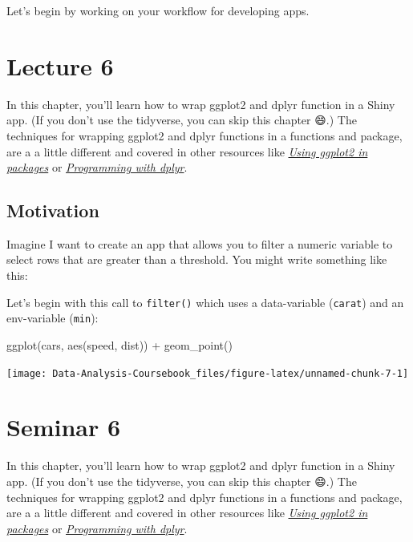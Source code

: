 \documentclass[
]{article}
\newenvironment{Shaded}{\begin{snugshade}}{\end{snugshade}}
\newcommand{\FunctionTok}[1]{\textcolor[rgb]{0.00,0.00,0.00}{#1}}
\newcommand{\NormalTok}[1]{#1}
\newcommand{\SpecialCharTok}[1]{\textcolor[rgb]{0.00,0.00,0.00}{#1}}
\begin{document}
Let's begin by working on your workflow for developing apps.

\hypertarget{lecture6}{%
\section{Lecture 6}\label{lecture6}}

In this chapter, you'll learn how to wrap ggplot2 and dplyr function in a Shiny app.
(If you don't use the tidyverse, you can skip this chapter 😄.) The techniques for wrapping ggplot2 and dplyr functions in a functions and package, are a a little different and covered in other resources like \href{http://ggplot2.tidyverse.org/dev/articles/ggplot2-in-packages.html}{\emph{Using ggplot2 in packages}} or \href{http://dplyr.tidyverse.org/articles/programming.html}{\emph{Programming with dplyr}}.

\hypertarget{tidy-motivation}{%
\subsection{Motivation}\label{tidy-motivation}}

Imagine I want to create an app that allows you to filter a numeric variable to select rows that are greater than a threshold.
You might write something like this:

Let's begin with this call to \texttt{filter()} which uses a data-variable (\texttt{carat}) and an env-variable (\texttt{min}):

\begin{Shaded}
\begin{Highlighting}[]
\FunctionTok{ggplot}\NormalTok{(cars, }\FunctionTok{aes}\NormalTok{(speed, dist)) }\SpecialCharTok{+} 
  \FunctionTok{geom\_point}\NormalTok{()}
\end{Highlighting}
\end{Shaded}

\begin{center}\texttt{[image: Data-Analysis-Coursebook\_files/figure-latex/unnamed-chunk-7-1]} \end{center}

\hypertarget{seminar6}{%
\section{Seminar 6}\label{seminar6}}

In this chapter, you'll learn how to wrap ggplot2 and dplyr function in a Shiny app.
(If you don't use the tidyverse, you can skip this chapter 😄.) The techniques for wrapping ggplot2 and dplyr functions in a functions and package, are a a little different and covered in other resources like \href{http://ggplot2.tidyverse.org/dev/articles/ggplot2-in-packages.html}{\emph{Using ggplot2 in packages}} or \href{http://dplyr.tidyverse.org/articles/programming.html}{\emph{Programming with dplyr}}.
\end{document}
